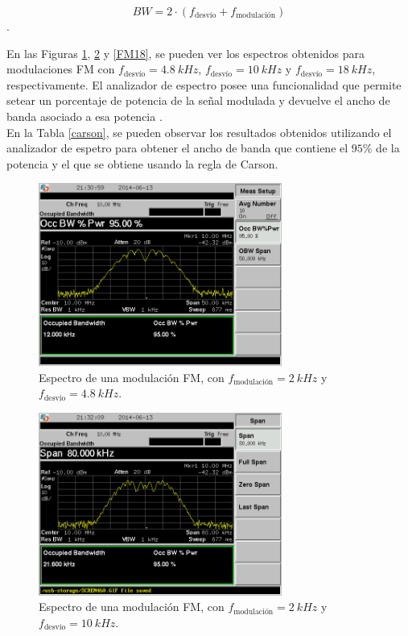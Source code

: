 \documentclass[a4paper,10pt]{article}
\begin{document}
		$$BW=2\cdot(f_{\mbox{desv\'io}}+f_{\mbox{modulaci\'on}})$$.
		
		\indent En las Figuras \ref{FM48}, \ref{FM10} y \ref{FM18}, se pueden 
		ver los espectros obtenidos para modulaciones FM con 
		$f_{\mbox{desv\'io}}=4.8~kHz$, $f_{\mbox{desv\'io}}=10~kHz$ y 
		$f_{\mbox{desv\'io}}=18~kHz$, respectivamente. El analizador de espectro
		posee una funcionalidad que permite setear un porcentaje de potencia de 
		la se\~nal modulada y devuelve el ancho de banda asociado a esa potencia
		. \\
		\indent En la Tabla \ref{carson}, se pueden observar los resultados 
		obtenidos utilizando el analizador de espetro para obtener el ancho de 
		banda que contiene el $95\%$ de la potencia y el que se obtiene usando 
		la regla de Carson.	
		
		\begin{figure}[!htb]
			\centering
			\includegraphics[width=8cm]
			{Imagenes/SCREN460.png}
			\caption{Espectro de una modulaci\'on FM, con $
			f_{\mbox{modulaci\'on}}=2~kHz$ y $f_{\mbox{desv\'io}}=4.8~kHz$.}
			\label{FM48} 
		\end{figure}		
		
		\begin{figure}[!htb]
			\centering
			\includegraphics[width=8cm]
			{Imagenes/SCREN461.png}
			\caption{Espectro de una modulaci\'on FM, con $
			f_{\mbox{modulaci\'on}}=2~kHz$ y $f_{\mbox{desv\'io}}=10~kHz$.}
			\label{FM10} 
		\end{figure}		
		
\end{document}
